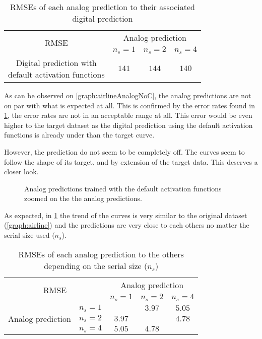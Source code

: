 \begin{table}[H]
  \centering
  \begin{tabular}{|c|c|c|c|}
    \hline
    \multirow{2}{*}{\acs{RMSE}} & \multicolumn{3}{c|}{Analog prediction}\\
    \cline{2-4}
    & $n_s=1$ & $n_s=2$ & $n_s=4$ \\
    \hline
    \specialcell{Digital prediction with\\default activation functions} & $141$ & $144$ & $140$\\
    \hline
  \end{tabular}
  \caption{\acp{RMSE} of each analog prediction to their associated digital prediction}
  \label{tab:airlineAnalogNoC}
\end{table}

As can be observed on \cref{graph:airlineAnalogNoC}, the analog predictions are not on par with what is expected at all. This is confirmed by the error rates found in \cref{tab:airlineAnalogNoC}, the error rates are not in an acceptable range at all. This error would be even higher to the target dataset as the digital prediction using the default activation functions is already under than the target curve.

However, the prediction do not seem to be completely off. The curves seem to follow the shape of its target, and by extension of the target data. This deserves a closer look.

\begin{figure}[H]
  \centering
  
  \caption{Analog predictions trained with the default activation functions zoomed on the the analog predictions.}
  \label{graph:airlineAnalogNoCZoomed}
\end{figure}

As expected, in \cref{graph:airlineAnalogNoCZoomed} the trend of the curves is very similar to the original dataset (\cref{graph:airline}) and the predictions are very close to each others no matter the serial size used ($n_s$).

\begin{table}[H]
  \centering
  \begin{tabular}{|c|c|c|c|c|}
    \hline
    \multicolumn{2}{|c}{\multirow{2}{*}{\ac{RMSE}}} & \multicolumn{3}{|c|}{Analog prediction}\\
    \cline{3-5}
    \multicolumn{2}{|c}{} & \multicolumn{1}{|c|}{$n_s=1$} & $n_s=2$ & $n_s=4$ \\
    \hline
    \multirow{3}{*}{Analog prediction} & $n_s=1$ &\cellcolor[HTML]{202020} & $3.97$ & $5.05$\\
    \cline{2-5}
    & $n_s=2$  & $3.97$ & \cellcolor[HTML]{202020} & $4.78$\\
    \cline{2-5}
    & $n_s=4$ & $5.05$ & $4.78$ & \cellcolor[HTML]{202020}\\
    \hline
  \end{tabular}
  \caption{\acp{RMSE} of each analog prediction to the others depending on the serial size ($n_s$)}
  \label{tab:airlineAnalogNoCZoomed}
\end{table}

